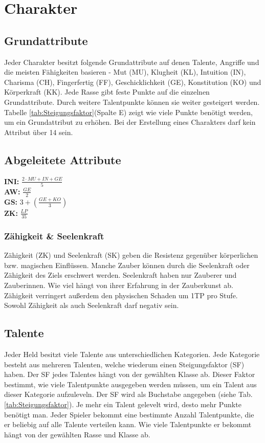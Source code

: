 {\let\clearpage\relax\chapter{Charakter}}
\section{Grundattribute}
Jeder Charakter besitzt folgende Grundattribute auf denen Talente, Angriffe und die meisten Fähigkeiten basieren - Mut (MU), Klugheit (KL), Intuition (IN), Charisma (CH), Fingerfertig (FF), Geschicklichkeit (GE), Konstitution (KO) und Körperkraft (KK). Jede Rasse gibt feste Punkte auf die einzelnen Grundattribute. Durch weitere Talentpunkte können sie weiter gesteigert werden. Tabelle \ref{tab:Steigungsfaktor}(Spalte E) zeigt wie viele Punkte benötigt werden, um ein Grundattribut zu erhöhen. Bei der Erstellung eines Charakters darf kein Attribut über 14 sein.

\section{Abgeleitete Attribute}

\textbf{INI:} $\frac{2 \cdot MU+IN+GE}{5}$ \\
\textbf{AW:} $\frac{GE}{2}$ \\
\textbf{GS:} $3+(\frac{GE+KO}{3})$ \\
\textbf{ZK:} $\frac{LP}{35}$

\subsection{Zähigkeit \& Seelenkraft}
Zähigkeit (ZK) und Seelenkraft (SK) geben die Resistenz gegenüber körperlichen bzw. magischen Einflüssen. Manche Zauber können durch die Seelenkraft oder Zähigkeit des Ziels erschwert werden. Seelenkraft haben nur Zauberer und Zauberinnen. Wie viel hängt von ihrer Erfahrung in der Zauberkunst ab. Zähigkeit verringert außerdem den physischen Schaden um 1TP pro Stufe. Sowohl Zähigkeit als auch Seelenkraft darf negativ sein.

\section{Talente}
Jeder Held besitzt viele Talente aus unterschiedlichen Kategorien. Jede Kategorie besteht aus mehreren Talenten, welche wiederum einen Steigungsfaktor (SF) haben. Der SF jedes Talentes hängt von der gewählten Klasse ab. Dieser Faktor bestimmt, wie viele Talentpunkte ausgegeben werden müssen, um ein Talent aus dieser Kategorie aufzuleveln. Der SF wird als Buchstabe angegeben (siehe Tab. \ref{tab:Steigungsfaktor}). Je mehr ein Talent gelevelt wird, desto mehr Punkte benötigt man. Jeder Spieler bekommt eine bestimmte Anzahl Talentpunkte, die er beliebig auf alle Talente verteilen kann. Wie viele Talentpunkte er bekommt hängt von der gewählten Rasse und Klasse ab.
 
